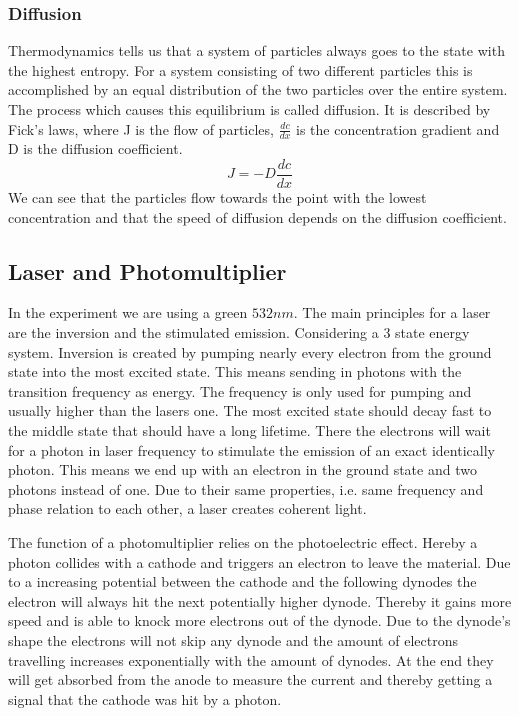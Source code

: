 \documentclass[]{article}
\begin{document}
\subsubsection{Diffusion}
Thermodynamics tells us that a system of particles always goes to the state with the highest entropy. For a system consisting of two different particles this is accomplished by an equal distribution of the two particles over the entire system. The process which causes this equilibrium is called diffusion. It is described by Fick's laws, where J is the flow of particles, $\frac{dc}{dx} $ is the concentration gradient and D is the diffusion coefficient. 
\[ J=-D\frac{dc}{dx}\]
We can see that the particles flow towards the point with the lowest concentration and that the speed of diffusion depends on the diffusion coefficient.

\subsection{Laser and Photomultiplier}
In the experiment we are using a green $532nm$. The main principles for a laser are the inversion and the stimulated emission. Considering a 3 state energy system. Inversion is created by pumping nearly every electron from the ground state into the most excited state. This means sending in photons with the transition frequency as energy. The frequency is only used for pumping and usually higher than the lasers one. The most excited state should decay fast to the middle state that should have a long lifetime. There the electrons will wait for a photon in laser frequency to stimulate the emission of an exact identically photon. This means we end up with an electron in the ground state and two photons instead of one. Due to their same properties, i.e. same frequency and phase relation to each other, a laser creates coherent light.

The function of a photomultiplier relies on the photoelectric effect. Hereby a photon collides with a cathode and triggers an electron to leave the material.
Due to a increasing potential between the cathode and the following dynodes the electron will always hit the next potentially higher dynode. Thereby it gains more speed and is able to knock more electrons out of the dynode. Due to the dynode's shape the electrons will not skip any dynode and the amount of electrons travelling increases exponentially with the amount of dynodes. At the end they will get absorbed from the anode to measure the current and thereby getting a signal that the cathode was hit by a photon.
 
\end{document}
